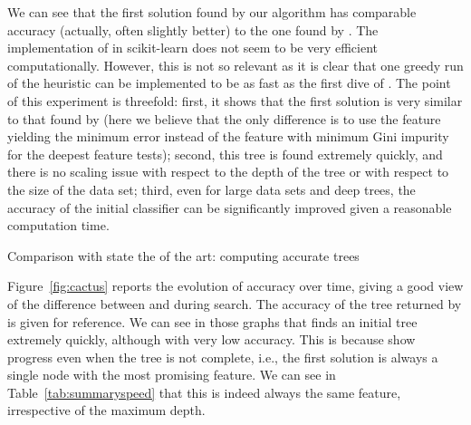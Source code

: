 \documentclass{llncs}
\begin{document}
\medskip

We can see that the first solution found by our algorithm has comparable accuracy (actually, often slightly better) to the one found by \cart. The implementation of \cart in scikit-learn does not seem to be very efficient computationally. However, this is not so relevant as it is clear that one greedy run of the heuristic can be implemented to be as fast as the first dive of \budalg. The point of this experiment is threefold: first, it shows that the first solution is very similar to that found by \cart (here we believe that the only difference is to use the feature yielding the minimum error instead of the feature with minimum Gini impurity for the deepest feature tests); second, this tree
is found extremely quickly, and there is no scaling issue with respect to the depth of the tree or with respect to the size of the data set; third, even for large data sets and deep trees, the accuracy of the initial classifier can be significantly improved given a reasonable computation time.




\begin{table}[htbp]
\begin{center}
\begin{footnotesize}
\tabcolsep=1.8pt

\end{footnotesize}
\end{center}
\caption{\label{tab:summaryspeed} Comparison with state the of the art: computing accurate trees}
\end{table}


Figure~\ref{fig:cactus} reports the evolution of accuracy over time, giving a good view of the difference between \murtree and \budalg during search. The accuracy of the tree returned by \cart is given for reference. 
We can see in those graphs that \murtree finds an initial tree extremely quickly, although with very low accuracy. This is because \murtree show progress even when the tree is not complete, i.e., the first solution is always a single node with the most promising feature. We can see in Table~\ref{tab:summaryspeed} that this is indeed always the same feature, irrespective of the maximum depth.
\end{document}
